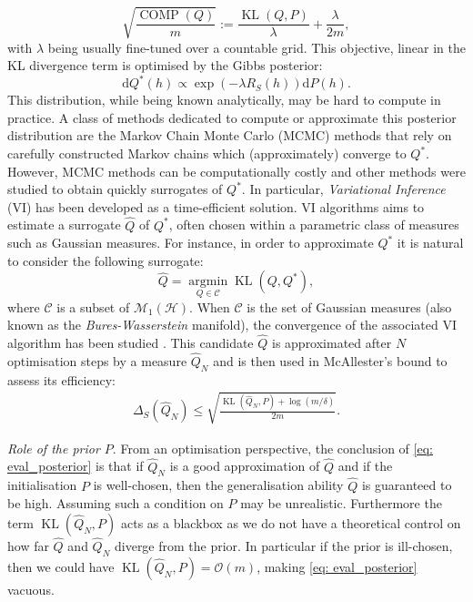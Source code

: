 $$ \sqrt{\frac{\operatorname{COMP}(Q)}{m}} := \frac{\operatorname{KL}(Q,P)}{\lambda} + \frac{\lambda}{2m},$$
with $\lambda$ being usually fine-tuned over a countable grid.
This objective, linear in the KL divergence term is optimised by the Gibbs posterior:
$$ \mathrm{d}Q^*(h)\propto \exp(-\lambda R_S(h)) \mathrm{d}P(h).$$
This distribution, while being known analytically, may be hard to compute in practice. A class of methods dedicated to compute or approximate this posterior distribution are the Markov Chain Monte Carlo (MCMC) methods that rely on carefully constructed Markov chains which (approximately) converge to $Q^*$. However, MCMC methods can be computationally costly and other methods were studied to obtain quickly surrogates of $Q^*$. In particular, \emph{Variational Inference} (VI) has been developed as a time-efficient solution. VI algorithms aims to estimate a surrogate $\hat{Q}$ of $Q^*$, often chosen within a parametric class of measures such as Gaussian measures. For instance, in order to approximate $Q^*$ it is natural to consider the following surrogate:
$$ \hat{Q} = \underset{Q\in \mathcal{C}}{\operatorname{argmin}} \operatorname{KL}(Q,Q^*) ,$$
where $\mathcal{C}$ is a subset of $\mathcal{M}_1(\mathcal{H})$. When $\mathcal{C}$ is the set of Gaussian measures (also known as the \emph{Bures-Wasserstein} manifold), the convergence of the associated VI algorithm has been studied \citep{altschuler2021aver,lambert2022variational}.
This candidate $\hat{Q}$ is approximated after $N$ optimisation steps by a measure $\hat{Q}_N$ and is then used in McAllester's bound to assess its efficiency:
\begin{align}
\label{eq: eval_posterior}
\Delta_S(\hat{Q}_N) \leq \sqrt{\frac{\operatorname{KL}(\hat{Q}_N,P) + \log(m/\delta)}{2m}}.
\end{align}

\textit{Role of the prior $P.$}
From an optimisation perspective, the conclusion of \eqref{eq: eval_posterior} is that if $\hat{Q}_N$ is a good approximation of $\hat{Q}$ and if the initialisation $P$ is well-chosen, then the generalisation ability $\hat{Q}$ is guaranteed to be high. Assuming such a condition on $P$ may be unrealistic. Furthermore the term $\operatorname{KL}(\hat{Q}_N,P)$ acts as a blackbox as we do not have a theoretical control on how far $\hat{Q}$ and $\hat{Q}_N$ diverge from the prior.
In particular if the prior is ill-chosen, then we could have $\operatorname{KL}(\hat{Q}_N,P) = \mathcal{O}(m)$, making \eqref{eq: eval_posterior} vacuous.


